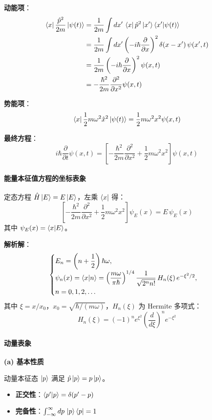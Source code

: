 \documentclass[12pt,a4paper]{article}
\begin{document}
\textbf{动能项}：
\begin{align*}
\bra{x}\frac{\hat{p}^2}{2m}\ket{\psi(t)}&=\frac{1}{2m}\int dx'\,\bra{x}\hat{p}^2\ket{x'}\braket{x'|\psi(t)}\\
&=\frac{1}{2m}\int dx'\left(-i\hbar\frac{\partial}{\partial x}\right)^2\delta(x-x')\,\psi(x',t)\\
&=\frac{1}{2m}\left(-i\hbar\frac{\partial}{\partial x}\right)^2\psi(x,t)\\
&=-\frac{\hbar^2}{2m}\frac{\partial^2}{\partial x^2}\psi(x,t)
\end{align*}

\textbf{势能项}：
\[
\bra{x}\frac{1}{2}m\omega^2\hat{x}^2\ket{\psi(t)}=\frac{1}{2}m\omega^2 x^2\psi(x,t)
\]

\textbf{最终方程}：
\[
i\hbar\frac{\partial}{\partial t}\psi(x,t)=\left[-\frac{\hbar^2}{2m}\frac{\partial^2}{\partial x^2}+\frac{1}{2}m\omega^2 x^2\right]\psi(x,t)
\]

\paragraph{能量本征值方程的坐标表象}

定态方程 $\hat{H}\ket{E}=E\ket{E}$，左乘 $\bra{x}$ 得：
\[
\left[-\frac{\hbar^2}{2m}\frac{\partial^2}{\partial x^2}+\frac{1}{2}m\omega^2 x^2\right]\psi_E(x)=E\,\psi_E(x)
\]
其中 $\psi_E(x)=\braket{x|E}$。

\textbf{解析解}：
\[
\begin{cases}
E_n=\left(n+\dfrac{1}{2}\right)\hbar\omega,\\[6pt]
\psi_n(x)=\braket{x|n}=\left(\dfrac{m\omega}{\pi\hbar}\right)^{1/4}\dfrac{1}{\sqrt{2^n n!}}\,H_n(\xi)\,e^{-\xi^2/2},\\[6pt]
n=0,1,2,\ldots
\end{cases}
\]
其中 $\xi=x/x_0$，$x_0=\sqrt{\hbar/(m\omega)}$，$H_n(\xi)$ 为 Hermite 多项式：
\[
H_n(\xi)=(-1)^n e^{\xi^2}\left(\frac{d}{d\xi}\right)^n e^{-\xi^2}
\]

\paragraph{动量表象}

\textbf{(a) 基本性质}

动量本征态 $\ket{p}$ 满足 $\hat{p}\ket{p}=p\ket{p}$。

\begin{itemize}
    \item \textbf{正交性}：$\braket{p'|p}=\delta(p'-p)$
    \item \textbf{完备性}：$\int_{-\infty}^{\infty}dp\,\ket{p}\bra{p}=1$
\end{itemize}
\end{document}
